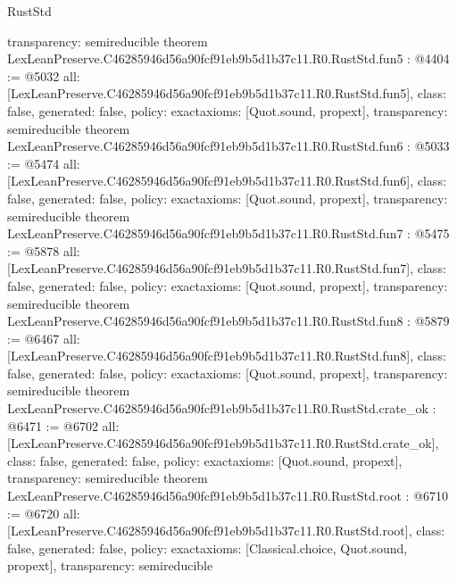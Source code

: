 \begin{lexlean}{RustStd}
\begin{coremodule}
{  transparency: semireducible
}
theorem LexLeanPreserve.C46285946d56a90fcf91eb9b5d1b37c11.R0.RustStd.fun5 : @4404 := @5032 {
  all: [LexLeanPreserve.C46285946d56a90fcf91eb9b5d1b37c11.R0.RustStd.fun5],
  class: false,
  generated: false,
  policy: exact{axioms: [Quot.sound, propext]},
  transparency: semireducible
}
theorem LexLeanPreserve.C46285946d56a90fcf91eb9b5d1b37c11.R0.RustStd.fun6 : @5033 := @5474 {
  all: [LexLeanPreserve.C46285946d56a90fcf91eb9b5d1b37c11.R0.RustStd.fun6],
  class: false,
  generated: false,
  policy: exact{axioms: [Quot.sound, propext]},
  transparency: semireducible
}
theorem LexLeanPreserve.C46285946d56a90fcf91eb9b5d1b37c11.R0.RustStd.fun7 : @5475 := @5878 {
  all: [LexLeanPreserve.C46285946d56a90fcf91eb9b5d1b37c11.R0.RustStd.fun7],
  class: false,
  generated: false,
  policy: exact{axioms: [Quot.sound, propext]},
  transparency: semireducible
}
theorem LexLeanPreserve.C46285946d56a90fcf91eb9b5d1b37c11.R0.RustStd.fun8 : @5879 := @6467 {
  all: [LexLeanPreserve.C46285946d56a90fcf91eb9b5d1b37c11.R0.RustStd.fun8],
  class: false,
  generated: false,
  policy: exact{axioms: [Quot.sound, propext]},
  transparency: semireducible
}
theorem LexLeanPreserve.C46285946d56a90fcf91eb9b5d1b37c11.R0.RustStd.crate_ok : @6471 := @6702 {
  all: [LexLeanPreserve.C46285946d56a90fcf91eb9b5d1b37c11.R0.RustStd.crate_ok],
  class: false,
  generated: false,
  policy: exact{axioms: [Quot.sound, propext]},
  transparency: semireducible
}
theorem LexLeanPreserve.C46285946d56a90fcf91eb9b5d1b37c11.R0.RustStd.root : @6710 := @6720 {
  all: [LexLeanPreserve.C46285946d56a90fcf91eb9b5d1b37c11.R0.RustStd.root],
  class: false,
  generated: false,
  policy: exact{axioms: [Classical.choice, Quot.sound, propext]},
  transparency: semireducible
}


\end{coremodule}
\end{lexlean}
